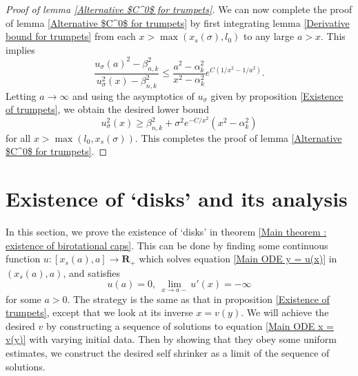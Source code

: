 \documentclass[pdflatex,sn-mathphys-num]{sn-jnl}
\begin{document}
\begin{proof}[Proof of lemma \ref{Alternative $C^0$ for trumpets}]
We can now complete the proof of lemma \ref{Alternative $C^0$ for trumpets} by first integrating lemma \ref{Derivative bound for trumpets} from each $x > \max(x_{s}(\sigma), l_0)$ to any large $a > x$. This implies
\begin{equation}
    \frac{u_{\sigma}(a)^2 - \beta_{n,k}^2}{u_{\sigma}^2(x) - \beta_{n,k}^2} \leq \frac{a^2 - \alpha_k^2}{x^2 - \alpha_k^2}e^{C(1/x^2 - 1/a^2)}.
\end{equation}
Letting $a \to \infty$ and using the asymptotics of $u_{\sigma}$ given by proposition \ref{Existence of trumpets}, we obtain the desired lower bound
$$u_{\sigma}^2(x) \geq \beta_{n,k}^2 + \sigma^2e^{-C/x^2}(x^2 - \alpha_k^2)$$
for all $x > \max(l_0, x_{s}(\sigma))$. This completes the proof of lemma \ref{Alternative $C^0$ for trumpets}.
\end{proof}
\section{Existence of `disks' and its analysis}\label{section 4}
In this section, we prove the existence of `disks' in theorem \ref{Main theorem : existence of birotational caps}. This can be done by finding some continuous function $u : [x_{s}(a), a] \to \mathbf{R}_+$ which solves equation \eqref{Main ODE y = u(x)} in $(x_{s}(a), a)$, and satisfies
$$u(a) = 0 , \ \lim_{x \to a-}u'(x) = -\infty$$
for some $a > 0$. The strategy is the same as that in proposition \ref{Existence of trumpets}, except that we look at its inverse $x = v(y)$. We will achieve the desired $v$ by constructing a sequence of solutions to equation \eqref{Main ODE x = v(y)} with varying initial data. Then by showing that they obey some uniform estimates, we construct the desired self shrinker as a limit of the sequence of solutions. 
\end{document}
